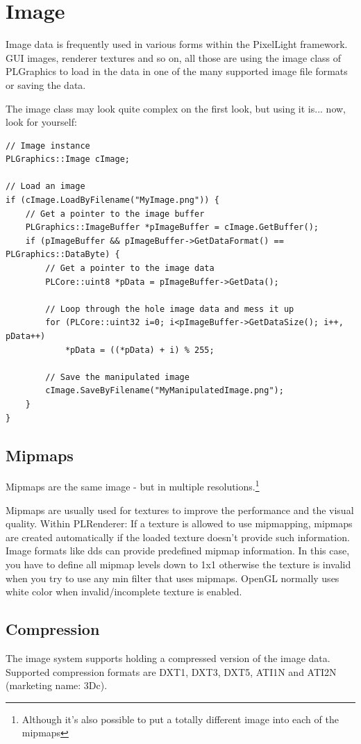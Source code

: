 \section{Image}
Image data is frequently used in various forms within the PixelLight framework. \ac{GUI} images, renderer textures and so on, all those are using the image class of PLGraphics to load in the data in one of the many supported image file formats or saving the data.

The image class may look quite complex on the first look, but using it is... now, look for yourself:

\begin{lstlisting}[caption=Image usage]
// Image instance
PLGraphics::Image cImage;

// Load an image
if (cImage.LoadByFilename("MyImage.png")) {
	// Get a pointer to the image buffer
	PLGraphics::ImageBuffer *pImageBuffer = cImage.GetBuffer();
	if (pImageBuffer && pImageBuffer->GetDataFormat() == PLGraphics::DataByte) {
		// Get a pointer to the image data
		PLCore::uint8 *pData = pImageBuffer->GetData();

		// Loop through the hole image data and mess it up
		for (PLCore::uint32 i=0; i<pImageBuffer->GetDataSize(); i++, pData++)
			*pData = ((*pData) + i) % 255;

		// Save the manipulated image
		cImage.SaveByFilename("MyManipulatedImage.png");
	}
}
\end{lstlisting}




\subsection{Mipmaps}
Mipmaps are the same image - but in multiple resolutions.\footnote{Although it's also possible to put a totally different image into each of the mipmaps}

Mipmaps are usually used for textures to improve the performance and the visual quality.
Within PLRenderer: If a texture is allowed to use mipmapping, mipmaps are created automatically if the loaded texture doesn't provide such information. Image formats like dds can provide predefined mipmap information. In this case, you have to define all mipmap levels down to 1x1 otherwise the texture is invalid when you try to use any min filter that uses mipmaps. \ac{OpenGL} normally uses white color when invalid/incomplete texture is enabled.




\subsection{Compression}
The image system supports holding a compressed version of the image data. Supported compression formats are DXT1, DXT3, DXT5, ATI1N and ATI2N (marketing name: 3Dc).

